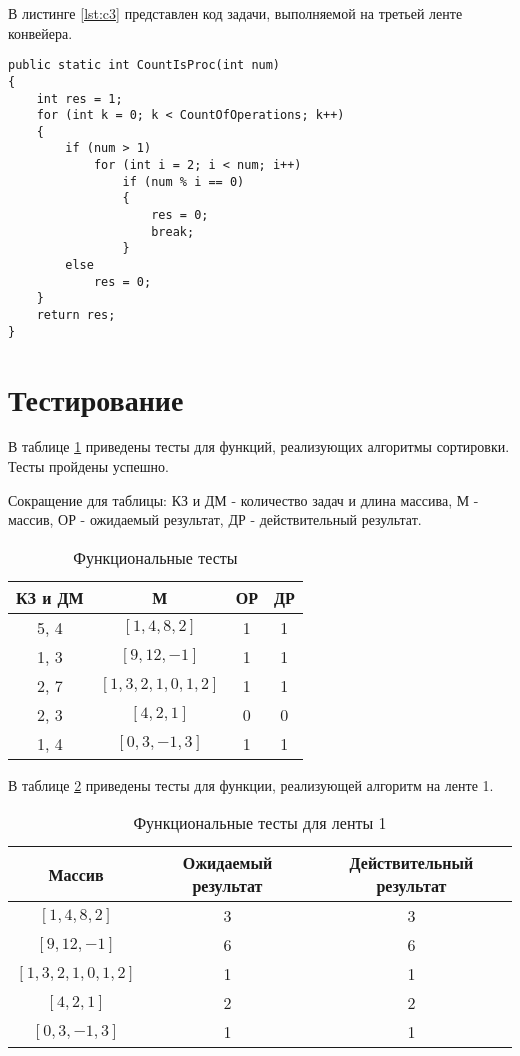 В листинге \ref{lst:c3} представлен код задачи, выполняемой на третьей ленте конвейера.

\begin{lstlisting}[label=lst:c3,caption=Реализация алгоритма определния числа на простоту]
public static int CountIsProc(int num)
{
	int res = 1;
	for (int k = 0; k < CountOfOperations; k++)
	{
		if (num > 1)
			for (int i = 2; i < num; i++)
				if (num % i == 0)
				{
					res = 0;
					break;
				}
		else
			res = 0;
	}
	return res;
}
\end{lstlisting}

\captionsetup{singlelinecheck = false, justification=centering}

\section{Тестирование}

В таблице \ref{tbl:functional_test} приведены тесты для функций, реализующих алгоритмы сортировки. Тесты пройдены успешно.

Сокращение для таблицы: КЗ и ДМ - количество задач и длина массива, М - массив, ОР - ожидаемый результат, ДР - действительный результат.

\begin{table}[h]
	\begin{center}
	\caption{\label{tbl:functional_test} Функциональные тесты}
		\begin{tabular}{|c|c|c|c|}
			\hline
			КЗ и ДМ & М & ОР & ДР \\ 
			\hline
			5, 4  & $[1,4,8,2]$        & 1 & 1\\
			1, 3  & $[9,12,-1]$        & 1 & 1\\
			2, 7  & $[1,3,2,1,0,1,2]$  & 1 & 1\\
			2, 3  & $[4,2,1]$          & 0 & 0\\
			1, 4  & $[0,3,-1,3]$       & 1 & 1\\
			\hline
		\end{tabular}
	\end{center}
\end{table}

В таблице \ref{tbl:ft2} приведены тесты для функции, реализующей алгоритм на ленте 1.

\begin{table}[h]
	\begin{center}
		\caption{\label{tbl:ft2} Функциональные тесты для ленты 1}
		\begin{tabular}{|c|c|c|}
			\hline
			Массив & Ожидаемый результат & Действительный результат \\ 
			\hline
			 $[1,4,8,2]$        & 3 & 3\\
			 $[9,12,-1]$        & 6 & 6\\
			 $[1,3,2,1,0,1,2]$  & 1 & 1\\
			 $[4,2,1]$          & 2 & 2\\
			 $[0,3,-1,3]$       & 1 & 1\\
			\hline
		\end{tabular}
	\end{center}
\end{table}

